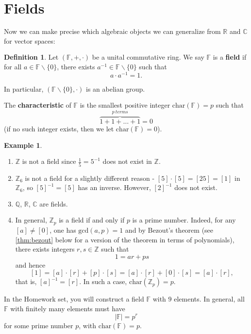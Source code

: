 \documentclass[11pt,openany]{book}
\theoremstyle{plain}
\theoremstyle{definition}
\newtheorem{definition}[definition]{Definition}
\newtheorem{example}[example]{Example}
\theoremstyle{remark}
\begin{document}
\section{Fields}
Now we can make precise which algebraic objects we can generalize from $\mathbb{R}$ and $\mathbb{C}$ for vector spaces:
\begin{definition}
    Let $(\mathbb{F},+,\cdot)$ be a unital commutative ring. We say $\mathbb{F}$ is a {\bf field} if for all $a \in \mathbb{F} \backslash \{0\}$, there exists $a^{-1} \in \mathbb{F} \backslash \{0\}$ such that
    $$a \cdot a^{-1} = 1.$$

    In particular, $(\mathbb{F} \backslash \{0\}, \cdot)$ is an abelian group.
    
    The {\bf characteristic} of $\mathbb{F}$ is the smallest positive integer $\mathrm{char}(\mathbb{F}) = p$ such that 
    $$\overbrace{1+1+ \dots + 1}^{p\ terms} = 0$$ 
    (if no such integer exists, then we let $\mathrm{char}(\mathbb{F}) = 0$).
\end{definition}

\begin{example}
    \begin{enumerate}
        \item $\mathbb{Z}$ is not a field since $\frac{1}{5} = 5^{-1}$ does not exist in $\mathbb{Z}$. 
        \item $\mathbb{Z}_6$ is not a field for a slightly different reason - $[5] \cdot [5] = [25] = [1]$ in $\mathbb{Z}_6$, so $[5]^{-1} = [5]$ has an inverse. However, $[2]^{-1}$ does not exist.
        \item  $\mathbb{Q}$, $\mathbb{R}$, $\mathbb{C}$ are fields.
        \item In general, $\mathbb{Z}_p$ is a field if and only if $p$ is a prime number. Indeed, for any $[a] \neq [0]$, one has $\mathrm{gcd}(a,p) = 1$ and by Bezout's theorem (see \autoref{thm:bezout} below for a version of the theorem in terms of polynomials), there exists integers $r, s \in \mathbb{Z}$ such that
        $$1 = ar + ps$$
        and hence 
        $$[1] = [a]\cdot [r] + [p]\cdot [s] = [a]\cdot [r] + [0]\cdot [s] = [a]\cdot [r],$$
        that is, $[a]^{-1} = [r]$.
        In such a case, $\mathrm{char}(\mathbb{Z}_p) = p$. 
    \end{enumerate}
\end{example}
In the Homework set, you will construct a field $\mathbb{F}$ with $9$ elements. In general, all $\mathbb{F}$ with finitely many elements must have
$$|\mathbb{F}| = p^r$$
for some prime number $p$, with $\mathrm{char}(\mathbb{F}) = p$.
\end{document}
